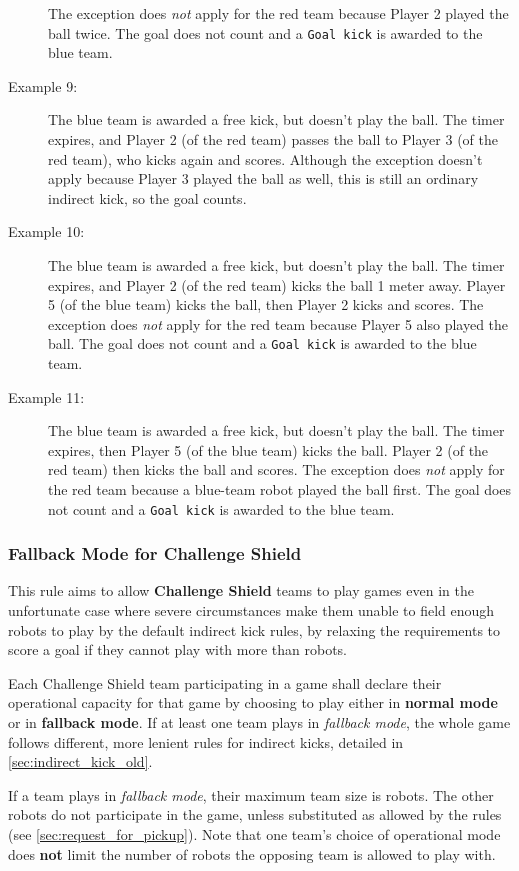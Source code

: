 \begin{description}
  The exception does \textit{not} apply for the red team because Player 2 played the ball twice. The goal does not count and a \texttt{Goal kick} is awarded to the blue team.
  \item[Example 9:] The blue team is awarded a free kick, but doesn't play the ball. The timer expires, and Player 2 (of the red team) passes the ball to Player 3 (of the red team), who kicks again and scores.
  Although the exception doesn't apply because Player 3 played the ball as well, this is still an ordinary indirect kick, so the goal counts.
  \item[Example 10:] The blue team is awarded a free kick, but doesn't play the ball. The timer expires, and Player 2 (of the red team) kicks the ball 1 meter away.
  Player 5 (of the blue team) kicks the ball, then Player 2 kicks and scores.
  The exception does \textit{not} apply for the red team because Player 5 also played the ball. The goal does not count and a \texttt{Goal kick} is awarded to the blue team.
  \item[Example 11:] The blue team is awarded a free kick, but doesn't play the ball. The timer expires, then Player 5 (of the blue team) kicks the ball.
  Player 2 (of the red team) then kicks the ball and scores.
  The exception does \textit{not} apply for the red team because a blue-team robot played the ball first. The goal does not count and a \texttt{Goal kick} is awarded to the blue team.
\end{description}

\subsubsection{Fallback Mode for Challenge Shield}
\label{sec:fallback_mode}

This rule aims to allow \textbf{Challenge Shield} teams to play games
even in the unfortunate case where severe circumstances make them unable to
field enough robots to play by the default indirect kick rules,
by relaxing the requirements to score a goal if they cannot play with more than \MaxRobotsInFallback{} robots.

Each Challenge Shield team participating in a game shall declare their operational
capacity for that game by choosing to play either in \textbf{normal mode} or in \textbf{fallback mode}.
If at least one team plays in \textit{fallback mode}, the whole game follows different,
more lenient rules for indirect kicks, detailed in \cref{sec:indirect_kick_old}.

If a team plays in \textit{fallback mode}, their maximum team size is \textbf{\MaxRobotsInFallback} robots.
The other robots do not participate in the game, unless substituted
as allowed by the rules (see \cref{sec:request_for_pickup}).
Note that one team's choice of operational mode does \textbf{not} limit
the number of robots the opposing team is allowed to play with.

